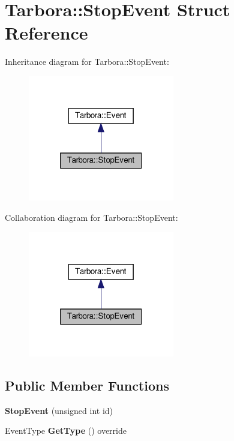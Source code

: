 \hypertarget{structTarbora_1_1StopEvent}{}\section{Tarbora\+:\+:Stop\+Event Struct Reference}
\label{structTarbora_1_1StopEvent}


Inheritance diagram for Tarbora\+:\+:Stop\+Event\+:\nopagebreak
\begin{figure}[H]
\begin{center}
\leavevmode
\includegraphics[width=181pt]{structTarbora_1_1StopEvent__inherit__graph}
\end{center}
\end{figure}


Collaboration diagram for Tarbora\+:\+:Stop\+Event\+:\nopagebreak
\begin{figure}[H]
\begin{center}
\leavevmode
\includegraphics[width=181pt]{structTarbora_1_1StopEvent__coll__graph}
\end{center}
\end{figure}
\subsection*{Public Member Functions}
\begin{DoxyCompactItemize}
\item 
\mbox{\label{structTarbora_1_1StopEvent_af119cb3cf28165962d168abf32ab1557}} 
{\bfseries Stop\+Event} (unsigned int id)
\item 
\mbox{\label{structTarbora_1_1StopEvent_ad5ede4a224fcf1ab2f89150f0394bb3e}} 
Event\+Type {\bfseries Get\+Type} () override
\end{DoxyCompactItemize}
